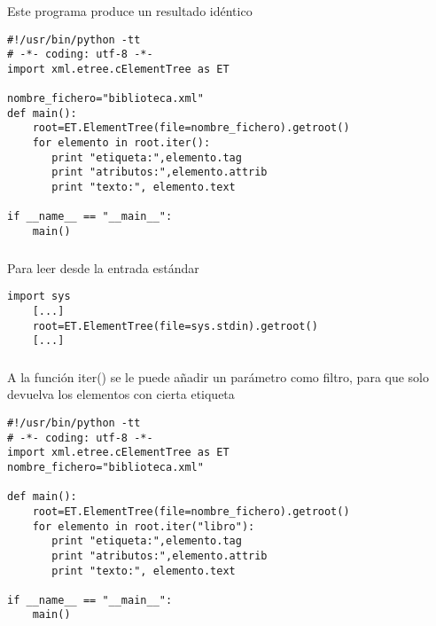 \documentclass[ucs]{beamer}
\begin{document}
\begin{frame}[fragile]
\frametitle{}
Este programa produce un resultado idéntico

  \begin{footnotesize}
  \begin{verbatim}
#!/usr/bin/python -tt
# -*- coding: utf-8 -*-
import xml.etree.cElementTree as ET

nombre_fichero="biblioteca.xml"
def main():
    root=ET.ElementTree(file=nombre_fichero).getroot()
    for elemento in root.iter():
       print "etiqueta:",elemento.tag
       print "atributos:",elemento.attrib
       print "texto:", elemento.text

if __name__ == "__main__":
    main()
  \end{verbatim}
  \end{footnotesize}
\end{frame}


\begin{frame}[fragile]
\frametitle{}
Para leer desde la entrada estándar


  \begin{footnotesize}
  \begin{verbatim}
import sys
    [...]
    root=ET.ElementTree(file=sys.stdin).getroot()
    [...]

  \end{verbatim}
  \end{footnotesize}

\end{frame}


\begin{frame}[fragile]
\frametitle{}
A la función iter() se le puede añadir un parámetro como filtro, para que
solo devuelva los elementos con cierta etiqueta

  \begin{footnotesize}
  \begin{verbatim}
#!/usr/bin/python -tt
# -*- coding: utf-8 -*-
import xml.etree.cElementTree as ET
nombre_fichero="biblioteca.xml"

def main():
    root=ET.ElementTree(file=nombre_fichero).getroot()
    for elemento in root.iter("libro"):
       print "etiqueta:",elemento.tag
       print "atributos:",elemento.attrib
       print "texto:", elemento.text

if __name__ == "__main__":
    main()
  \end{verbatim}
  \end{footnotesize}

\end{frame}
\end{document}
